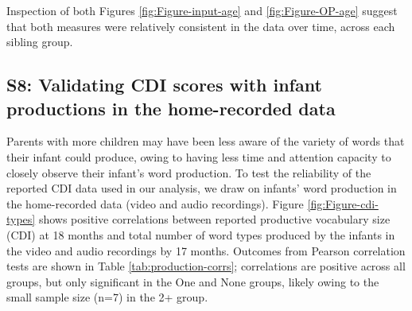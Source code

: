 \documentclass[
  man,mask,floatsintext]{apa6}
\begin{document}
Inspection of both Figures \ref{fig:Figure-input-age} and \ref{fig:Figure-OP-age} suggest that both measures were relatively consistent in the data over time, across each sibling group.

\newpage

\hypertarget{s8-validating-cdi-scores-with-infant-productions-in-the-home-recorded-data}{%
\subsection{S8: Validating CDI scores with infant productions in the home-recorded data}\label{s8-validating-cdi-scores-with-infant-productions-in-the-home-recorded-data}}

Parents with more children may have been less aware of the variety of words that their infant could produce, owing to having less time and attention capacity to closely observe their infant's word production. To test the reliability of the reported CDI data used in our analysis, we draw on infants' word production in the home-recorded data (video and audio recordings). Figure \ref{fig:Figure-cdi-types} shows positive correlations between reported productive vocabulary size (CDI) at 18 months and total number of word types produced by the infants in the video and audio recordings by 17 months. Outcomes from Pearson correlation tests are shown in Table \ref{tab:production-corrs}; correlations are positive across all groups, but only significant in the One and None groups, likely owing to the small sample size (n=7) in the 2+ group.
\end{document}
